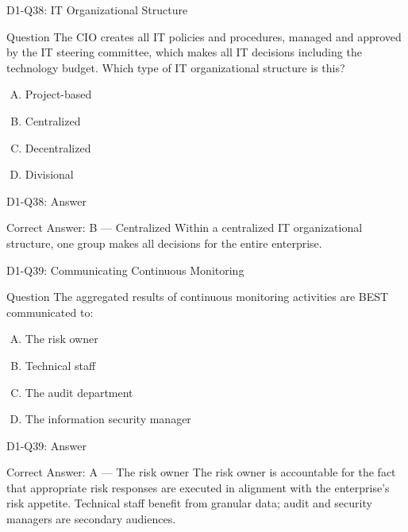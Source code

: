 \documentclass{beamer}
\begin{document}
	\begin{frame}{D1-Q38: IT Organizational Structure}
		\begin{block}{Question}
			The CIO creates all IT policies and procedures, managed and approved by the IT steering committee, which makes all IT decisions including the technology budget. Which type of IT organizational structure is this?
		\end{block}
		\begin{enumerate}[(A)]
			\item Project-based
			\item Centralized
			\item Decentralized
			\item Divisional
		\end{enumerate}
	\end{frame}
	\begin{frame}{D1-Q38: Answer}
		\begin{block}{Correct Answer: B --- Centralized}
			Within a centralized IT organizational structure, one group makes all decisions for the entire enterprise.
		\end{block}
	\end{frame}
	
	\begin{frame}{D1-Q39: Communicating Continuous Monitoring}
		\begin{block}{Question}
			The aggregated results of continuous monitoring activities are BEST communicated to:
		\end{block}
		\begin{enumerate}[(A)]
			\item The risk owner
			\item Technical staff
			\item The audit department
			\item The information security manager
		\end{enumerate}
	\end{frame}
	\begin{frame}{D1-Q39: Answer}
		\begin{block}{Correct Answer: A --- The risk owner}
			The risk owner is accountable for the fact that appropriate risk responses are executed in alignment with the enterprise's risk appetite. Technical staff benefit from granular data; audit and security managers are secondary audiences.
		\end{block}
	\end{frame}
	
\end{document}
